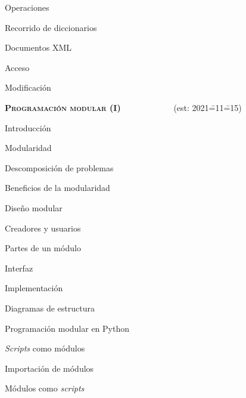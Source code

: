 \begin{longenum}
\begin{longenum}
\begin{longenum}
            \begin{longenum}
                \item Operaciones
                \item Recorrido de diccionarios
            \end{longenum}
            \item Documentos XML
            \begin{longenum}
                \item Acceso
                \item Modificación
            \end{longenum}
        \end{longenum}
    \end{longenum}
    \item \textbf{\textsc{Programación modular (I)}} \ \ \ \ \ \ \ \ \ \ \ \ (est: 2021\==11\==15)
    \begin{longenum}
        \item Introducción
        \begin{longenum}
            \item Modularidad
            \item Descomposición de problemas
            \item Beneficios de la modularidad
        \end{longenum}
        \item Diseño modular
        \begin{longenum}
            \item Creadores y usuarios
            \item Partes de un módulo
            \begin{longenum}
                \item Interfaz
                \item Implementación
            \end{longenum}
            \item Diagramas de estructura
        \end{longenum}
        \item Programación modular en Python
        \begin{longenum}
            \item \textit{Scripts} como módulos
            \item Importación de módulos
            \item Módulos como \textit{scripts}

\end{longenum}
\end{longenum}
\end{longenum}
